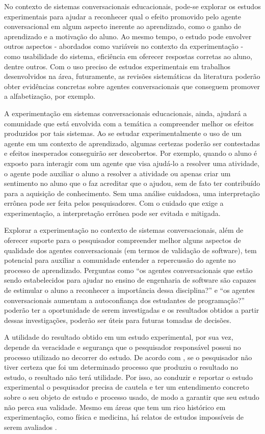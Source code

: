 No contexto de sistemas conversacionais educacionais, pode-se explorar os estudos experimentais para ajudar a reconhecer qual o efeito promovido pelo agente conversacional em algum aspecto inerente ao aprendizado, como o ganho de aprendizado e a motivação do aluno. Ao mesmo tempo, o estudo pode envolver outros aspectos - abordados como variáveis no contexto da experimentação - como usabilidade do sistema, eficiência em oferecer respostas corretas ao aluno, dentre outros. Com o uso preciso de estudos experimentais em trabalhos desenvolvidos na área, futuramente, as revisões sistemáticas da literatura poderão obter evidências concretas sobre agentes conversacionais que conseguem promover a alfabetização, por exemplo.

A experimentação em sistemas conversacionais educacionais, ainda, ajudará a comunidade que está envolvida com a temática a compreender melhor os efeitos produzidos por tais sistemas. Ao se estudar experimentalmente o uso de um agente em um contexto de aprendizado, algumas certezas poderão ser contestadas e efeitos inesperados conseguirão ser descobertos. Por exemplo, quando o aluno é exposto para interagir com um agente que visa ajudá-lo a resolver uma atividade, o agente pode auxiliar o aluno a resolver a atividade ou apenas criar um sentimento no aluno que o faz acreditar que o ajudou, sem de fato ter contribuído para a aquisição de conhecimento. Sem uma análise cuidadosa, uma interpretação errônea pode ser feita pelos pesquisadores. Com o cuidado que exige a experimentação, a interpretação errônea pode ser evitada e mitigada. 

Explorar a experimentação no contexto de sistemas conversacionais, além de oferecer suporte para o pesquisador compreender melhor alguns aspectos de qualidade dos agentes conversacionais (em termos de validação de software), tem potencial para auxiliar a comunidade entender a repercussão do agente no processo de aprendizado. Perguntas como ``os agentes conversacionais que estão sendo estabelecidos para ajudar no ensino de engenharia de software são capazes de estimular o aluno a reconhecer a importância dessa disciplina?'' e ``os agentes conversacionais aumentam a autoconfiança dos estudantes de programação?'' poderão ter a oportunidade de serem investigadas e os resultados obtidos a partir dessas investigações, poderão ser úteis para futuras tomadas de decisões.

A utilidade do resultado obtido em um estudo experimental, por sua vez, depende da veracidade e segurança que o pesquisador responsável possui no processo utilizado no decorrer do estudo. De acordo com , se o pesquisador não tiver certeza que foi um determinado processo que produziu o resultado no estudo, o resultado não terá utilidade. Por isso, ao conduzir e reportar o estudo experimental o pesquisador precisa de cautela e ter um entendimento concreto sobre o seu objeto de estudo e processo usado, de modo a garantir que seu estudo não perca sua validade. Mesmo em áreas que tem um rico histórico em experimentação, como física e medicina, há relatos de estudos impossíveis de serem avaliados \cite{Kitchenham:2002}.

